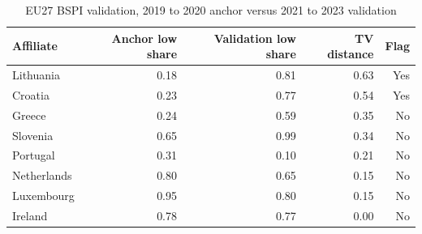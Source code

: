 \begin{table}[H]
\centering
\small
\setlength{\tabcolsep}{4pt}
\caption[EU27 BSPI validation]{EU27 BSPI validation, 2019 to 2020 anchor versus 2021 to 2023 validation}
\label{tab:stage1_bspi_updated}
\begin{tabular}{@{}lrrrr@{}}
\toprule
Affiliate & Anchor low share & Validation low share & TV distance & Flag \\
\midrule
Lithuania & 0.18 & 0.81 & 0.63 & Yes \\
Croatia & 0.23 & 0.77 & 0.54 & Yes \\
Greece & 0.24 & 0.59 & 0.35 & No \\
Slovenia & 0.65 & 0.99 & 0.34 & No \\
Portugal & 0.31 & 0.10 & 0.21 & No \\
Netherlands & 0.80 & 0.65 & 0.15 & No \\
Luxembourg & 0.95 & 0.80 & 0.15 & No \\
Ireland & 0.78 & 0.77 & 0.00 & No \\
\bottomrule
\end{tabular}
\end{table}
